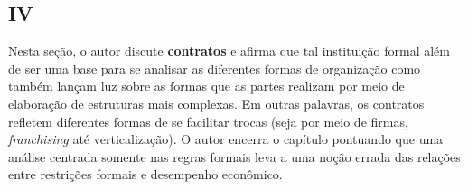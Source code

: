 \subsection*{IV}

Nesta seção, o autor discute \textbf{contratos} e afirma que tal instituição formal além de ser uma base para se analisar as diferentes formas de organização como também lançam luz sobre as formas que as partes realizam por meio de elaboração de estruturas mais complexas. Em outras palavras, os contratos refletem  diferentes formas de se facilitar trocas (seja por meio de firmas, \textit{franchising} até verticalização). O autor encerra o capítulo pontuando que uma análise centrada somente nas regras formais leva a uma noção errada das relações entre restrições formais e desempenho econômico.
